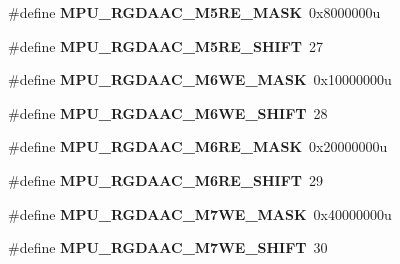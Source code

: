 \begin{DoxyCompactItemize}
\item 
\#define {\bfseries M\+P\+U\+\_\+\+R\+G\+D\+A\+A\+C\+\_\+\+M5\+R\+E\+\_\+\+M\+A\+SK}~0x8000000u\hypertarget{group__MPU__Register__Masks_ga96965e716b1fba479c7903a5ae64e305}{}\label{group__MPU__Register__Masks_ga96965e716b1fba479c7903a5ae64e305}

\item 
\#define {\bfseries M\+P\+U\+\_\+\+R\+G\+D\+A\+A\+C\+\_\+\+M5\+R\+E\+\_\+\+S\+H\+I\+FT}~27\hypertarget{group__MPU__Register__Masks_ga80db0bdec596e5f2ae168cf02b3e68d0}{}\label{group__MPU__Register__Masks_ga80db0bdec596e5f2ae168cf02b3e68d0}

\item 
\#define {\bfseries M\+P\+U\+\_\+\+R\+G\+D\+A\+A\+C\+\_\+\+M6\+W\+E\+\_\+\+M\+A\+SK}~0x10000000u\hypertarget{group__MPU__Register__Masks_ga675c429d4b18a11c7dd4d6f81e8fec4b}{}\label{group__MPU__Register__Masks_ga675c429d4b18a11c7dd4d6f81e8fec4b}

\item 
\#define {\bfseries M\+P\+U\+\_\+\+R\+G\+D\+A\+A\+C\+\_\+\+M6\+W\+E\+\_\+\+S\+H\+I\+FT}~28\hypertarget{group__MPU__Register__Masks_ga67ade60c5f10bf98e10770b8af8d2a87}{}\label{group__MPU__Register__Masks_ga67ade60c5f10bf98e10770b8af8d2a87}

\item 
\#define {\bfseries M\+P\+U\+\_\+\+R\+G\+D\+A\+A\+C\+\_\+\+M6\+R\+E\+\_\+\+M\+A\+SK}~0x20000000u\hypertarget{group__MPU__Register__Masks_ga520ccd7afefe94f2c563302f3996dbe3}{}\label{group__MPU__Register__Masks_ga520ccd7afefe94f2c563302f3996dbe3}

\item 
\#define {\bfseries M\+P\+U\+\_\+\+R\+G\+D\+A\+A\+C\+\_\+\+M6\+R\+E\+\_\+\+S\+H\+I\+FT}~29\hypertarget{group__MPU__Register__Masks_ga0166b93dc6445dac1d73289ecdb8eda1}{}\label{group__MPU__Register__Masks_ga0166b93dc6445dac1d73289ecdb8eda1}

\item 
\#define {\bfseries M\+P\+U\+\_\+\+R\+G\+D\+A\+A\+C\+\_\+\+M7\+W\+E\+\_\+\+M\+A\+SK}~0x40000000u\hypertarget{group__MPU__Register__Masks_gae26a39c4f03a041788d55172d23c277a}{}\label{group__MPU__Register__Masks_gae26a39c4f03a041788d55172d23c277a}

\item 
\#define {\bfseries M\+P\+U\+\_\+\+R\+G\+D\+A\+A\+C\+\_\+\+M7\+W\+E\+\_\+\+S\+H\+I\+FT}~30\hypertarget{group__MPU__Register__Masks_gaa8390e90127f6bfa83f10b5987ac2ec7}{}\label{group__MPU__Register__Masks_gaa8390e90127f6bfa83f10b5987ac2ec7}


\end{DoxyCompactItemize}
